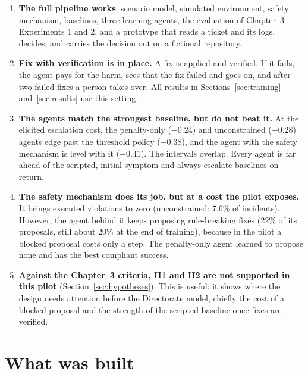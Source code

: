 \documentclass[11pt,a4paper]{article}
\begin{document}
\begin{enumerate}
  \item \textbf{The full pipeline works}: scenario model, simulated environment, safety mechanism, baselines, three learning agents, the evaluation of Chapter~3 Experiments 1 and 2, and a prototype that reads a ticket and its logs, decides, and carries the decision out on a fictional repository.
  \item \textbf{Fix with verification is in place.} A fix is applied and verified. If it fails, the agent pays for the harm, sees that the fix failed and goes on, and after two failed fixes a person takes over. All results in Sections~\ref{sec:training} and~\ref{sec:results} use this setting.
  \item \textbf{The agents match the strongest baseline, but do not beat it.} At the elicited escalation cost, the penalty-only ($-0.24$) and unconstrained ($-0.28$) agents edge past the threshold policy ($-0.38$), and the agent with the safety mechanism is level with it ($-0.41$). The intervals overlap. Every agent is far ahead of the scripted, initial-symptom and always-escalate baselines on return.
  \item \textbf{The safety mechanism does its job, but at a cost the pilot exposes.} It brings executed violations to zero (unconstrained: 7.6\% of incidents). However, the agent behind it keeps proposing rule-breaking fixes (22\% of its proposals, still about 20\% at the end of training), because in the pilot a blocked proposal costs only a step. The penalty-only agent learned to propose none and has the best compliant success.
  \item \textbf{Against the Chapter~3 criteria, H1 and H2 are not supported in this pilot} (Section~\ref{sec:hypotheses}). This is useful: it shows where the design needs attention before the Directorate model, chiefly the cost of a blocked proposal and the strength of the scripted baseline once fixes are verified.
\end{enumerate}

\section{What was built}
\end{document}
